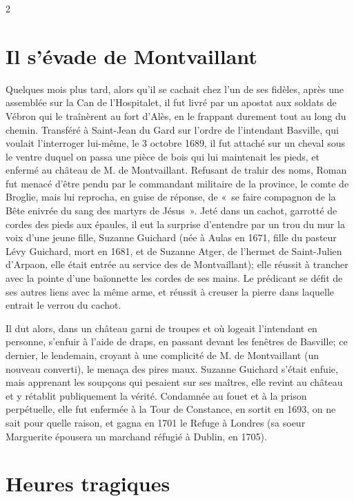 {\begin{multicols}{2}
\section*{Il s’évade de Montvaillant}

Quelques mois plus tard, alors qu’il se cachait chez l’un de ses fidèles, après une assemblée sur la Can de l’Hospitalet, il fut livré par un apostat aux soldats de Vébron qui le traînèrent au fort d’Alès, en le frappant durement tout au long du chemin. Transféré à Saint-Jean du Gard sur l’ordre de l’intendant Basville, qui voulait l’interroger lui-même, le 3 octobre 1689, il fut attaché sur un cheval sous le ventre duquel on passa une pièce de bois qui lui maintenait les pieds, et enfermé au château de M. de Montvaillant. Refusant de trahir des noms, Roman fut menacé d’être pendu par le commandant militaire de la province, le comte de Broglie, mais lui reprocha, en guise de réponse, de «~se faire compagnon de la Bête enivrée du sang des martyrs de Jésus~». Jeté dans un cachot, garrotté de cordes des pieds aux épaules, il eut la surprise d’entendre par un trou du mur la voix d’une jeune fille, Suzanne Guichard (née à Aulas en 1671, fille du pasteur Lévy Guichard, mort en 1681, et de Suzanne Atger, de l’hermet de Saint-Julien d’Arpaon, elle était entrée au service des de Montvaillant); elle réussit à trancher avec la pointe d’une baïonnette les cordes de ses mains. Le prédicant se défit de ses autres liens avec la même arme, et réussit à creuser la pierre dans laquelle entrait le verrou du cachot.

Il dut alors, dans un château garni de troupes et où logeait l’intendant en personne, s’enfuir à l’aide de draps, en passant devant les fenêtres de Basville; ce dernier, le lendemain, croyant à une complicité de M. de Montvaillant (un nouveau converti), le menaça des pires maux. Suzanne Guichard s’était enfuie, mais apprenant les soupçons qui pesaient sur ses maîtres, elle revint au château et y rétablit publiquement la vérité. Condamnée au fouet et à la prison perpétuelle, elle fut enfermée à la Tour de Constance, en sortit en 1693, on ne sait pour quelle raison, et gagna en 1701 le Refuge à Londres (sa soeur Marguerite épousera un marchand réfugié à Dublin, en 1705).

\section*{Heures tragiques}


\end{multicols}}

